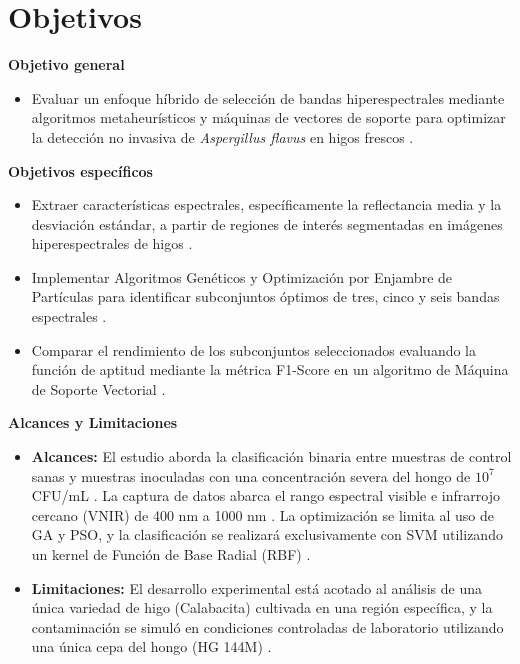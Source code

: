 \section{Objetivos}

\textbf{Objetivo general}
\begin{itemize}
    \item Evaluar un enfoque híbrido de selección de bandas hiperespectrales mediante algoritmos metaheurísticos y máquinas de vectores de soporte para optimizar la detección no invasiva de \textit{Aspergillus flavus} en higos frescos \cite{cruz-carrasco_detection_2024}.
\end{itemize}

\textbf{Objetivos específicos}
\begin{itemize}
    \item Extraer características espectrales, específicamente la reflectancia media y la desviación estándar, a partir de regiones de interés segmentadas en imágenes hiperespectrales de higos \cite{cruz-carrasco_detection_2024}.
    \item Implementar Algoritmos Genéticos y Optimización por Enjambre de Partículas para identificar subconjuntos óptimos de tres, cinco y seis bandas espectrales \cite{eiben_introduction_2015}.
    \item Comparar el rendimiento de los subconjuntos seleccionados evaluando la función de aptitud mediante la métrica F1-Score en un algoritmo de Máquina de Soporte Vectorial \cite{nagasubramanian_hyperspectral_2018}.
\end{itemize}

\textbf{Alcances y Limitaciones}
\begin{itemize}
    \item \textbf{Alcances:} El estudio aborda la clasificación binaria entre muestras de control sanas y muestras inoculadas con una concentración severa del hongo de $10^{7}$ CFU/mL \cite{cruz-carrasco_detection_2024}. La captura de datos abarca el rango espectral visible e infrarrojo cercano (VNIR) de 400 nm a 1000 nm \cite{specim_specim_2020}. La optimización se limita al uso de GA y PSO, y la clasificación se realizará exclusivamente con SVM utilizando un kernel de Función de Base Radial (RBF) \cite{musci_ice_2020, nagasubramanian_hyperspectral_2018}.
    \item \textbf{Limitaciones:} El desarrollo experimental está acotado al análisis de una única variedad de higo (Calabacita) cultivada en una región específica, y la contaminación se simuló en condiciones controladas de laboratorio utilizando una única cepa del hongo (HG 144M) \cite{cruz-carrasco_detection_2024}.
\end{itemize}

